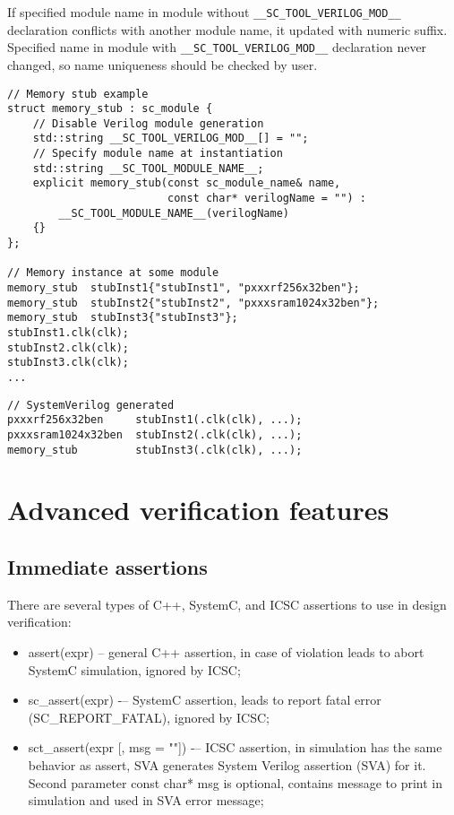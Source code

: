 If specified module name in module without {\tt \_\_SC\_TOOL\_VERILOG\_MOD\_\_} declaration conflicts with another module name, it updated with numeric suffix. Specified name in module with {\tt \_\_SC\_TOOL\_VERILOG\_MOD\_\_}  declaration never changed, so name uniqueness should be checked by user.

\begin{lstlisting}[style=mycpp]
// Memory stub example
struct memory_stub : sc_module {
    // Disable Verilog module generation
    std::string __SC_TOOL_VERILOG_MOD__[] = "";  
    // Specify module name at instantiation
    std::string __SC_TOOL_MODULE_NAME__;             
    explicit memory_stub(const sc_module_name& name,
                         const char* verilogName = "") :
        __SC_TOOL_MODULE_NAME__(verilogName)
    {}
};

// Memory instance at some module
memory_stub  stubInst1{"stubInst1", "pxxxrf256x32ben"};
memory_stub  stubInst2{"stubInst2", "pxxxsram1024x32ben"};
memory_stub  stubInst3{"stubInst3"};
stubInst1.clk(clk); 
stubInst2.clk(clk); 
stubInst3.clk(clk); 
...
\end{lstlisting}
%
\begin{lstlisting}[style=mycpp]
// SystemVerilog generated 
pxxxrf256x32ben     stubInst1(.clk(clk), ...);
pxxxsram1024x32ben  stubInst2(.clk(clk), ...);
memory_stub         stubInst3(.clk(clk), ...);
\end{lstlisting}


\section{Advanced verification features}\label{section:assertions}

\subsection{Immediate assertions}

There are several types of C++, SystemC, and ICSC assertions to use in design verification:

\begin{itemize}
\item assert(expr) -- general C++ assertion, in case of violation leads to abort SystemC simulation, ignored by ICSC;
\item sc\_assert(expr) -– SystemC assertion, leads to report fatal error (SC\_REPORT\_FATAL), ignored by ICSC;
\item sct\_assert(expr [, msg = ""]) -– ICSC assertion, in simulation has the same behavior as assert, SVA generates System Verilog assertion (SVA) for it. Second parameter const char* msg is optional, contains message to print in simulation and used in SVA error message;
\end{itemize}

